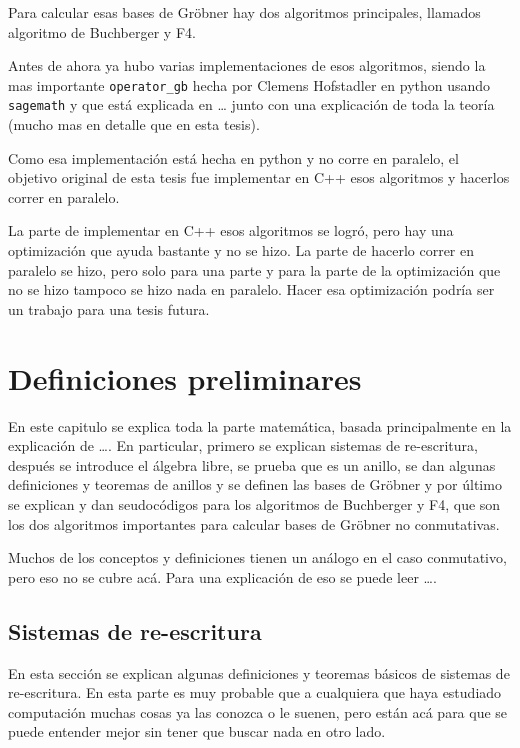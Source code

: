 \documentclass{report}
\theoremstyle{customstyle}
\theoremstyle{factstyle}
\begin{document}
Para calcular esas bases de Gröbner hay dos algoritmos principales, llamados algoritmo de Buchberger y F4.

Antes de ahora ya hubo varias implementaciones de esos algoritmos, siendo la mas importante \texttt{operator\_gb} hecha por Clemens Hofstadler en python usando \texttt{sagemath} y que está explicada en … %
junto con una explicación de toda la teoría (mucho mas en detalle que en esta tesis).

Como esa implementación está hecha en python y no corre en paralelo, el objetivo original de esta tesis fue implementar en C++ esos algoritmos y hacerlos correr en paralelo.

La parte de implementar en C++ esos algoritmos se logró, pero hay una optimización que ayuda bastante y no se hizo. La parte de hacerlo correr en paralelo se hizo, pero solo para una parte y para la parte de la optimización que no se hizo tampoco se hizo nada en paralelo. Hacer esa optimización podría ser un trabajo para una tesis futura.

\chapter{Definiciones preliminares}

En este capitulo se explica toda la parte matemática, basada principalmente en la explicación de …. %
En particular, primero se explican sistemas de re-escritura, después se introduce el álgebra libre, se prueba que es un anillo, se dan algunas definiciones y teoremas de anillos y se definen las bases de Gröbner y por último se explican y dan seudocódigos para los algoritmos de Buchberger y F4, que son los dos algoritmos importantes para calcular bases de Gröbner no conmutativas.

Muchos de los conceptos y definiciones tienen un análogo en el caso conmutativo, pero eso no se cubre acá. Para una explicación de eso se puede leer …. %

\section{Sistemas de re-escritura}

En esta sección se explican algunas definiciones y teoremas básicos de sistemas de re-escritura. En esta parte es muy probable que a cualquiera que haya estudiado computación muchas cosas ya las conozca o le suenen, pero están acá para que se puede entender mejor sin tener que buscar nada en otro lado.
\end{document}
